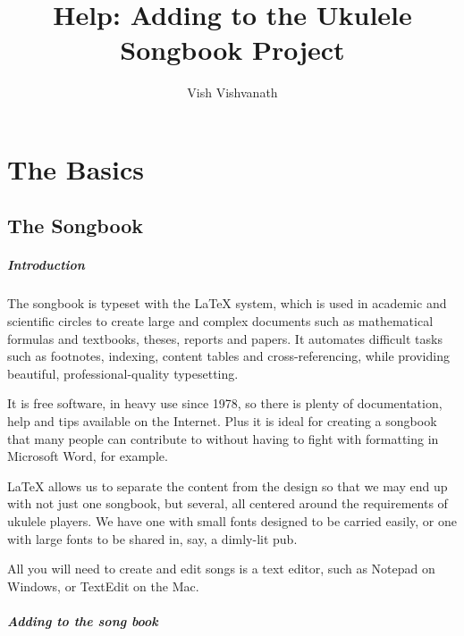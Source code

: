 \documentclass[16pt,a4paper,oneside]{book}
\title{Help: Adding to the Ukulele Songbook Project}
\author{Vish Vishvanath}
\newcommand{\latex}{\LaTeX\xspace}
\begin{document}
\pagestyle{plain}
\maketitle
\restoregeometry

\dominitoc
\dominilof
\dominilot
\tableofcontents

\setcounter{page}{1}

\chapter{The Basics}\label{ch:the_basics}
\section{The Songbook} %
\label{sec:the_songbook}

\paragraph{Introduction} %
\label{par:introduction}

The songbook is typeset with the \latex system, which is used in academic and scientific circles to create large and complex documents such as mathematical formulas and textbooks, theses, reports and papers. It automates difficult tasks such as footnotes, indexing, content tables and cross-referencing, while providing beautiful, professional-quality typesetting.

It is free software, in heavy use since 1978, so there is plenty of documentation, help and tips available on the Internet. Plus it is ideal for creating a songbook that many people can contribute to without having to fight with formatting in Microsoft Word, for example.

\latex allows us to separate the content from the design so that we may end up with not just one songbook, but several, all centered around the requirements of ukulele players. We have one with small fonts designed to be carried easily, or one with large fonts to be shared in, say, a dimly-lit pub.

All you will need to create and edit songs is a text editor, such as Notepad on Windows, or TextEdit on the Mac.


\paragraph{Adding to the song book} %
\label{par:adding_to_the_song_book}
\end{document}

